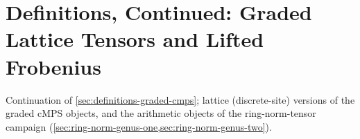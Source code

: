 
\section{Definitions, Continued: Graded Lattice Tensors and Lifted Frobenius}
\label{sec:definitions-g}

Continuation of \cref{sec:definitions-graded-cmps}; lattice (discrete-site) versions of the
graded cMPS objects, and the arithmetic objects of the ring-norm-tensor campaign
(\cref{sec:ring-norm-genus-one,sec:ring-norm-genus-two}).

